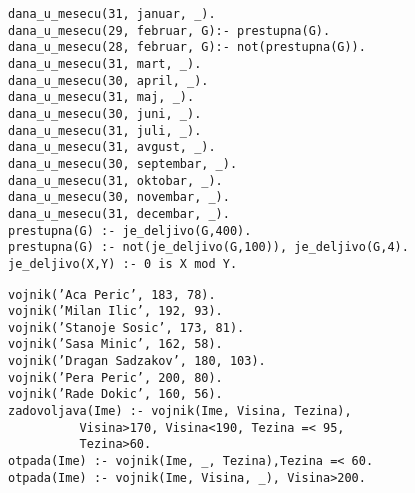 \documentclass[../main.tex]{subfiles}
\begin{document}
\begin{boxprimer}[width=\textwidth/3*2]
\begin{example}
\begin{Verbatim}
dana_u_mesecu(31, januar, _).
dana_u_mesecu(29, februar, G):- prestupna(G).
dana_u_mesecu(28, februar, G):- not(prestupna(G)).
dana_u_mesecu(31, mart, _).
dana_u_mesecu(30, april, _).
dana_u_mesecu(31, maj, _).
dana_u_mesecu(30, juni, _).
dana_u_mesecu(31, juli, _).
dana_u_mesecu(31, avgust, _).
dana_u_mesecu(30, septembar, _).
dana_u_mesecu(31, oktobar, _).
dana_u_mesecu(30, novembar, _).
dana_u_mesecu(31, decembar, _).
prestupna(G) :- je_deljivo(G,400).
prestupna(G) :- not(je_deljivo(G,100)), je_deljivo(G,4).
je_deljivo(X,Y) :- 0 is X mod Y.
\end{Verbatim}
\end{example}
\end{boxprimer}

\begin{boxprimer}[width=\textwidth/3*2]
\begin{example}
\begin{Verbatim}
vojnik(’Aca Peric’, 183, 78).
vojnik(’Milan Ilic’, 192, 93).
vojnik(’Stanoje Sosic’, 173, 81).
vojnik(’Sasa Minic’, 162, 58).
vojnik(’Dragan Sadzakov’, 180, 103).
vojnik(’Pera Peric’, 200, 80).
vojnik(’Rade Dokic’, 160, 56).
zadovoljava(Ime) :- vojnik(Ime, Visina, Tezina),
		  Visina>170, Visina<190, Tezina =< 95,
		  Tezina>60.
otpada(Ime) :- vojnik(Ime, _, Tezina),Tezina =< 60.
otpada(Ime) :- vojnik(Ime, Visina, _), Visina>200.
\end{Verbatim}
\end{example}
\end{boxprimer}
\end{document}
